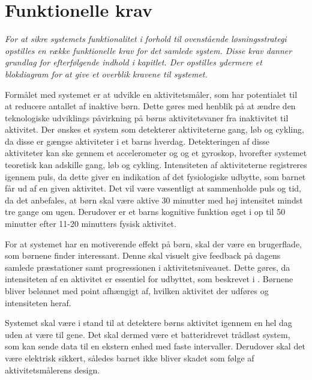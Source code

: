 \section{Funktionelle krav}\label{funktionellekrav}
\textit{For at sikre systemets funktionalitet i forhold til ovenstående løsningsstrategi opstilles en række funktionelle krav for det samlede system. Disse krav danner grundlag for efterfølgende indhold i kapitlet. Der opstilles ydermere et blokdiagram for at give et overblik kravene til systemet.}

Formålet med systemet er at udvikle en aktivitetsmåler, som har potentialet til at reducere antallet af inaktive børn. Dette gøres med henblik på at ændre den teknologiske udviklings påvirkning på børns aktivitetsvaner fra inaktivitet til aktivitet. Der ønskes et system som detekterer aktiviteterne gang, løb og cykling, da disse er gængse aktiviteter i et barns hverdag. Detekteringen af disse aktiviteter kan ske gennem et accelerometer og og et gyroskop, hvorefter systemet teoretisk kan adskille gang, løb og cykling. Intensiteten af aktiviteterne registreres igennem puls, da dette giver en indikation af det fysiologiske udbytte, som barnet får ud af en given aktivitet. Det vil være væsentligt at sammenholde puls og tid, da det anbefales, at børn skal være aktive 30 minutter med høj intensitet mindst tre gange om ugen. Derudover er et barns kognitive funktion øget i op til 50 minutter efter 11-20 minutters fysisk aktivitet.

For at systemet har en motiverende effekt på børn, skal der være en brugerflade, som børnene finder interessant. Denne skal visuelt give feedback på dagens samlede præstationer samt progressionen i aktivitetsniveauet. Dette gøres, da intensiteten af en aktivitet er essentiel for udbyttet, som beskrevet i . %
Børnene bliver belønnet med point afhængigt af, hvilken aktivitet der udføres og intensiteten heraf.  

Systemet skal være i stand til at detektere børns aktivitet igennem en hel dag uden at være til gene. %
Det skal dermed være et batteridrevet trådløst system, som kan sende data til en ekstern enhed med faste intervaller. Derudover skal det være elektrisk sikkert, således barnet ikke bliver skadet som følge af aktivitetsmålerens design. 

